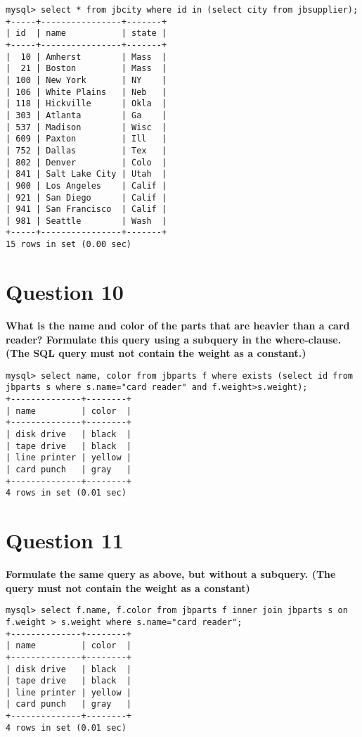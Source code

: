\documentclass{article}
\begin{document}
\begin{lstlisting}
mysql> select * from jbcity where id in (select city from jbsupplier);
+-----+----------------+-------+
| id  | name           | state |
+-----+----------------+-------+
|  10 | Amherst        | Mass  |
|  21 | Boston         | Mass  |
| 100 | New York       | NY    |
| 106 | White Plains   | Neb   |
| 118 | Hickville      | Okla  |
| 303 | Atlanta        | Ga    |
| 537 | Madison        | Wisc  |
| 609 | Paxton         | Ill   |
| 752 | Dallas         | Tex   |
| 802 | Denver         | Colo  |
| 841 | Salt Lake City | Utah  |
| 900 | Los Angeles    | Calif |
| 921 | San Diego      | Calif |
| 941 | San Francisco  | Calif |
| 981 | Seattle        | Wash  |
+-----+----------------+-------+
15 rows in set (0.00 sec)
\end{lstlisting}

\section*{Question 10}
\textbf{What is the name and color of the parts that are heavier than a card reader? Formulate this query using a subquery in the where-clause. (The SQL query must not contain the weight as a constant.)}

\begin{lstlisting}
mysql> select name, color from jbparts f where exists (select id from jbparts s where s.name="card reader" and f.weight>s.weight); 
+--------------+--------+
| name         | color  |
+--------------+--------+
| disk drive   | black  |
| tape drive   | black  |
| line printer | yellow |
| card punch   | gray   |
+--------------+--------+
4 rows in set (0.01 sec)
\end{lstlisting}

\pagebreak

\section*{Question 11}
\textbf{Formulate the same query as above, but without a subquery. (The query must not contain the weight as a constant)}

\begin{lstlisting}
mysql> select f.name, f.color from jbparts f inner join jbparts s on f.weight > s.weight where s.name="card reader";
+--------------+--------+
| name         | color  |
+--------------+--------+
| disk drive   | black  |
| tape drive   | black  |
| line printer | yellow |
| card punch   | gray   |
+--------------+--------+
4 rows in set (0.01 sec)
\end{lstlisting}
\end{document}
